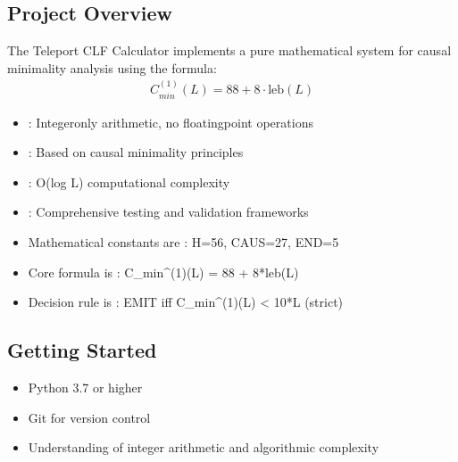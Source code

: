 \documentclass[letterpaper,10pt,english]{sphinxmanual}
\begin{document}
\subsection{Project Overview}
\label{\detokenize{contributing:project-overview}}
\sphinxAtStartPar
The Teleport CLF Calculator implements a pure mathematical system for causal minimality analysis using the formula:
\begin{equation*}
\begin{split}C_{min}^{(1)}(L) = 88 + 8 \cdot \text{leb}(L)\end{split}
\end{equation*}
\sphinxAtStartPar
{}
\begin{itemize}
\item {} 
\sphinxAtStartPar
{}: Integer\sphinxhyphen{}only arithmetic, no floating\sphinxhyphen{}point operations

\item {} 
\sphinxAtStartPar
{}: Based on causal minimality principles

\item {} 
\sphinxAtStartPar
{}: O(log L) computational complexity

\item {} 
\sphinxAtStartPar
{}: Comprehensive testing and validation frameworks

\end{itemize}

\sphinxAtStartPar
{}
\begin{itemize}
\item {} 
\sphinxAtStartPar
Mathematical constants are : H=56, CAUS=27, END=5

\item {} 
\sphinxAtStartPar
Core formula is : C\_min\textasciicircum{}(1)(L) = 88 + 8*leb(L)

\item {} 
\sphinxAtStartPar
Decision rule is : EMIT iff C\_min\textasciicircum{}(1)(L) \textless{} 10*L (strict)

\end{itemize}


\subsection{Getting Started}
\label{\detokenize{contributing:getting-started}}
\sphinxAtStartPar
{}
\begin{itemize}
\item {} 
\sphinxAtStartPar
Python 3.7 or higher

\item {} 
\sphinxAtStartPar
Git for version control

\item {} 
\sphinxAtStartPar
Understanding of integer arithmetic and algorithmic complexity

\end{itemize}
\end{document}
